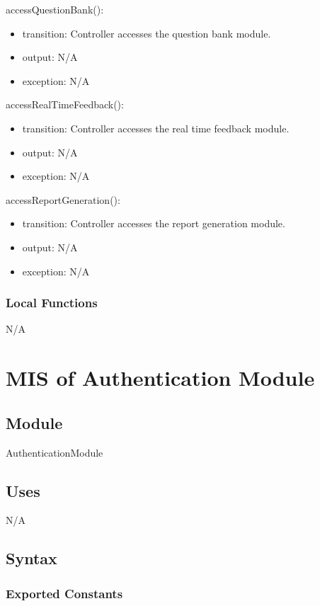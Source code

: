\documentclass[12pt, titlepage]{article}
\begin{document}
\noindent accessQuestionBank():
\begin{itemize}
\item transition: Controller accesses the question bank module.
\item output: N/A
\item exception: N/A
\end{itemize}

\noindent accessRealTimeFeedback():
\begin{itemize}
\item transition: Controller accesses the real time feedback module.
\item output: N/A
\item exception: N/A
\end{itemize}

\noindent accessReportGeneration():
\begin{itemize}
\item transition: Controller accesses the report generation module.
\item output: N/A
\item exception: N/A
\end{itemize}

\subsubsection{Local Functions}
N/A
\section{MIS of Authentication Module} \label{AuthenticationModule}


\subsection{Module}

AuthenticationModule

\subsection{Uses}

N/A

\subsection{Syntax}

\subsubsection{Exported Constants}
\end{document}
